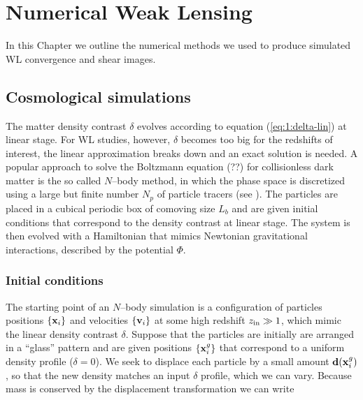 
\chapter{Numerical Weak Lensing}
\lhead[\fancyplain{}{\thepage}]{\fancyplain{}{\rightmark}}
 \thispagestyle{plain}
\setlength{\parindent}{10mm}

In this Chapter we outline the numerical methods we used to produce simulated WL convergence and shear images. 


\section{Cosmological simulations}
The matter density contrast $\delta$ evolves according to equation (\ref{eq:1:delta-lin}) at linear stage. For WL studies, however, $\delta$ becomes too big for the redshifts of interest, the linear approximation breaks down and an exact solution is needed. A popular approach to solve the Boltzmann equation (??) for collisionless dark matter is the so called $N$--body method, in which the phase space is discretized using a large but finite number $N_p$ of particle tracers (see \citep{gadget2}). The particles are placed in a cubical periodic box of comoving size $L_b$ and are given initial conditions that correspond to the density contrast at linear stage. The system is then evolved with a Hamiltonian that mimics Newtonian gravitational interactions, described by the potential $\Phi$.  

\subsection{Initial conditions}
The starting point of an $N$--body simulation is a configuration of particles positions $\{\mathbf{x}_i\}$ and velocities $\{\mathbf{v}_i\}$ at some high redshift $z_{\rm in}\gg 1$, which mimic the linear density contrast $\delta$. Suppose that the particles are initially are arranged in a ``glass'' pattern and are given positions $\{\mathbf{x}_i^g\}$ that correspond to a uniform density profile ($\delta=0$). We seek to displace each particle by a small amount $\mathbf{d}(\mathbf{x}_i^g)$, so that the new density matches an input $\delta$ profile, which we can vary. Because mass is conserved by the displacement transformation we can write

